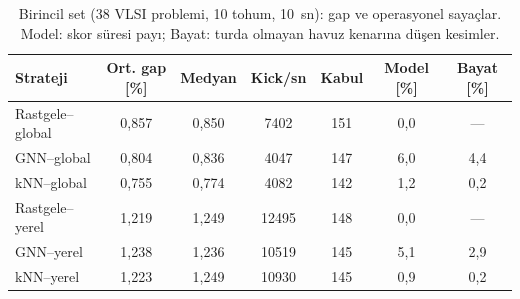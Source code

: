 \begin{table}[!htbp]
\centering\small\setlength{\tabcolsep}{4pt}
\caption{Birincil set (38 VLSI problemi, 10 tohum, 10~sn): gap ve operasyonel sayaçlar. Model: skor süresi payı; Bayat: turda olmayan havuz kenarına düşen kesimler.}
\label{tab:v2-primary-strategies}
\begin{tabular*}{\textwidth}{@{\extracolsep{\fill}}lcccccc}
\toprule
Strateji & Ort. gap [\%] & Medyan & Kick/sn & Kabul & Model [\%] & Bayat [\%] \\
\midrule
Rastgele--global & 0{,}857 & 0{,}850 & 7402 & 151 & 0{,}0 & --- \\
GNN--global & 0{,}804 & 0{,}836 & 4047 & 147 & 6{,}0 & 4{,}4 \\
kNN--global & 0{,}755 & 0{,}774 & 4082 & 142 & 1{,}2 & 0{,}2 \\
Rastgele--yerel & 1{,}219 & 1{,}249 & 12495 & 148 & 0{,}0 & --- \\
GNN--yerel & 1{,}238 & 1{,}236 & 10519 & 145 & 5{,}1 & 2{,}9 \\
kNN--yerel & 1{,}223 & 1{,}249 & 10930 & 145 & 0{,}9 & 0{,}2 \\
\bottomrule
\end{tabular*}
\end{table}
